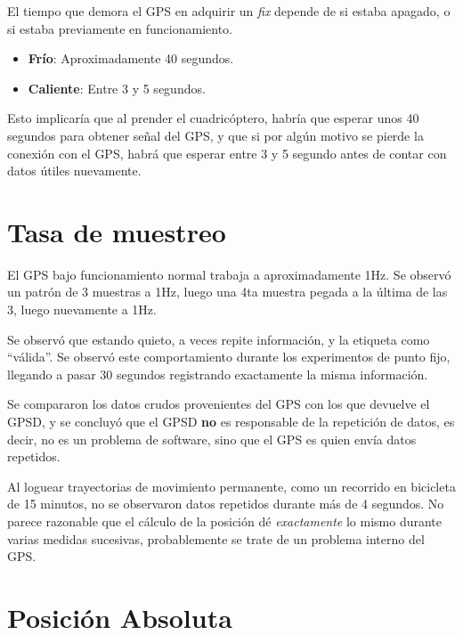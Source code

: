 \documentclass[main]{subfiles}
\begin{document}
El tiempo que demora el GPS en adquirir un \textit{fix} depende de si estaba apagado, o si estaba previamente en funcionamiento.
\begin{itemize}
\item \textbf{Frío}: Aproximadamente 40 segundos.
\item \textbf{Caliente}: Entre 3 y 5 segundos.
\end{itemize}

Esto implicaría que al prender el cuadricóptero, habría que esperar unos 40 segundos para obtener se\~nal del GPS, y que si por algún motivo se pierde la conexión con el GPS, habrá que esperar entre 3 y 5 segundo antes de contar con datos útiles nuevamente.

\section{Tasa de muestreo}
\label{sec:tasa-de-muestreo}

El GPS bajo funcionamiento normal trabaja a aproximadamente 1Hz. Se observ\'o un patr\'on de 3 muestras a 1Hz, luego una 4ta muestra pegada a la \'ultima de las 3, luego nuevamente a 1Hz.

Se observó que estando quieto, a veces repite información, y la etiqueta como ``válida''. Se observó este comportamiento durante los experimentos de punto fijo, llegando a pasar 30 segundos registrando exactamente la misma información.

Se compararon los datos crudos provenientes del GPS con los que devuelve el GPSD, y se concluyó que el GPSD \textbf{no} es responsable de la repetición de datos, es decir, no es un problema de software, sino que el GPS es quien env\'ia datos repetidos.

Al loguear trayectorias de movimiento permanente, como un recorrido en bicicleta de 15 minutos, no se observaron  datos repetidos durante más de 4 segundos. No parece razonable que el cálculo de la posición dé \textit{exactamente} lo mismo durante varias medidas sucesivas, probablemente se trate de un problema interno del GPS.

\section{Posición Absoluta}
\label{sec:posicion-absoluta}
\end{document}
